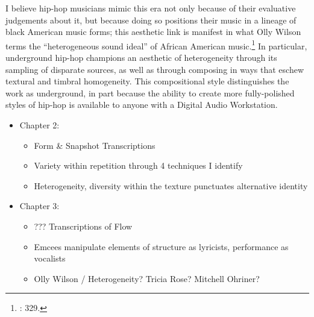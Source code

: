 I believe hip-hop musicians mimic this era not only because of their evaluative judgements about it, but
because doing so positions their music in a lineage of black American music forms; this aesthetic link is
manifest in what Olly Wilson terms the ``heterogeneous sound ideal'' of African American
music.\footnote{\cite{ollywilsonHeterogeneousSoundIdeal1992}: 329.} In particular, underground hip-hop
champions an aesthetic of heterogeneity through its sampling of disparate sources, as well as  through
composing in ways that eschew textural and timbral homogeneity. This compositional style distinguishes the
work as underground, in part because the ability to create more fully-polished styles of hip-hop is available
to anyone with a Digital Audio Workstation. 

\begin{itemize}
    \item Chapter 2: 
        \begin{itemize}
            \item Form \& Snapshot Transcriptions
            \item Variety within repetition through 4 techniques I identify
            \item Heterogeneity, diversity within the texture punctuates alternative identity
        \end{itemize}
    \item Chapter 3:
        \begin{itemize}
            \item ??? Transcriptions of Flow
            \item Emcees manipulate elements of structure as lyricists, performance as vocalists
            \item Olly Wilson / Heterogeneity? Tricia Rose? Mitchell Ohriner?
        \end{itemize}
\end{itemize}

